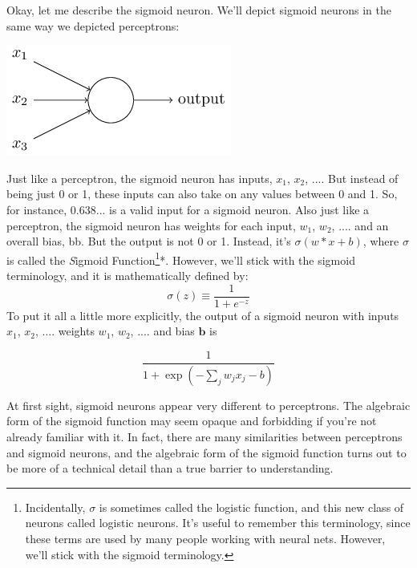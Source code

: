 \documentclass[a4paper,12pt]{report}%
\begin{document}
Okay, let me describe the sigmoid neuron. We'll depict sigmoid neurons in the same way we depicted perceptrons:

\begin{center}
 \includegraphics[width=0.6\linewidth]{images/tikz9.png}
\end{center}


Just like a perceptron, the sigmoid neuron has inputs, $x_{1}$, $x_{2}$, .... But instead of being just 0 or 1, these inputs can also take on any values between 0 and 1. So, for instance, 0.638... is a valid input for a sigmoid neuron. Also just like a perceptron, the sigmoid neuron has weights for each input, $w_{1}$, $w_{2}$, .... and an overall bias, bb. But the output is not 0 or 1. Instead, it's $\sigma(w*x+b)$, where $\sigma$ is called the {\emph Sigmoid Function}\footnote{\color{blue}Incidentally, $\sigma$ is sometimes called the logistic function, and this new class of neurons called logistic neurons. It's useful to remember this terminology, since these terms are used by many people working with neural nets. However, we'll stick with the sigmoid terminology.}{\color{blue}*}. %
However, we'll stick with the sigmoid terminology, and it is mathematically defined by:
\begin{equation}
\sigma(z) ≡ \frac{1}{1+e^{-z}}
\end{equation}
To put it all a little more explicitly, the output of a sigmoid neuron with inputs $x_{1}$, $x_{2}$, .... weights $w_{1}$, $w_{2}$, .... and bias $\mathbf{b}$ is

\begin{equation}
\frac{1} {1+ \exp(−\sum_{j} w_{j} x_{j} − b )}
\end{equation}

At first sight, sigmoid neurons appear very different to perceptrons. The algebraic form of the sigmoid function may seem opaque and forbidding if you're not already familiar with it. In fact, there are many similarities between perceptrons and sigmoid neurons, and the algebraic form of the sigmoid function turns out to be more of a technical detail than a true barrier to understanding.
\end{document}
